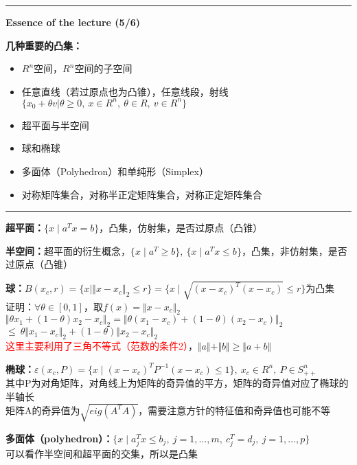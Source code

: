 \documentclass[11pt]{ctexart}         %
\begin{document}
\newpage
\hrule height 4pt
\begin{Large}
	\textbf{Essence of the lecture (5/6)}\\
\end{Large}
\begin{large}
	\textbf{几种重要的凸集：} 
\end{large}
\vspace{-16pt}
\begin{itemize} \setlength{\itemsep}{0pt}
	\item $R^n$空间，$R^n$空间的子空间
	\item 任意直线（若过原点也为凸锥），任意线段，射线$\{x_0+\theta v|\theta\geq 0,\ x\in R^n,\ \theta\in R,\ v\in R^n\}$ 
	\item 超平面与半空间
	\item 球和椭球
	\item 多面体（Polyhedron）和单纯形（Simplex）
	\item 对称矩阵集合，对称半正定矩阵集合，对称正定矩阵集合
\end{itemize}
\hrule height 4pt

\textbf{超平面：}$\{x\mid a^Tx=b\}$，凸集，仿射集，是否过原点（凸锥）

\textbf{半空间：}超平面的衍生概念，$\{x\mid a^T\geq b\},\ \{x\mid a^Tx\leq b\}$，凸集，非仿射集，是否过原点（凸锥）

\textbf{球：}$B(x_c,r)=\{x\mid \Vert x-x_c\Vert_2\leq r\}=\{x\mid \sqrt{(x-x_c)^T(x-x_c)}\leq r\}$为凸集\\
证明：$\forall \theta\in[0,1]$，取$f(x)=\Vert x-x_c\Vert_2$\\
\phantom{证明：}$\Vert \theta x_1+(1-\theta)x_2-x_c\Vert_2=\Vert \theta (x_1-x_c)+(1-\theta)(x_2-x_c)\Vert_2$\\
\phantom{证明：}$\leq\ \theta\Vert x_1-x_c\Vert_2+(1-\theta)\Vert x_2-x_c\Vert_2$\\
\phantom{证明：}\textcolor{red}{这里主要利用了三角不等式（范数的条件2）}，$\Vert a\Vert+\Vert b\Vert\geq \Vert a+b\Vert$

\textbf{椭球：}$\varepsilon(x_c,P)=\{x\mid (x-x_c)^TP^{-1}(x-x_c)\leq 1\},\ x_c\in R^n,\ P\in S_{++}^n$\\
\phantom{椭球：}其中P为对角矩阵，对角线上为矩阵的奇异值的平方，矩阵的奇异值对应了椭球的半轴长\\
\phantom{椭球：}矩阵A的奇异值为$\sqrt{eig(A^TA)}$，需要注意方针的特征值和奇异值也可能不等

\textbf{多面体（polyhedron）：}$\{x\mid a_j^Tx\leq b_j,\ j=1,\dots,m,\ c_j^T=d_j,\ j=1,\dots,p\}$\\
可以看作半空间和超平面的交集，所以是凸集
\end{document}

